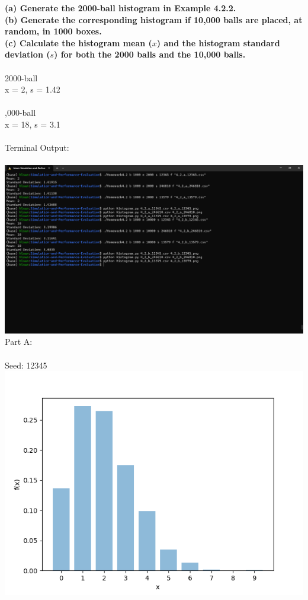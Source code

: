 \textbf{(a) Generate the 2000-ball histogram in Example 4.2.2.\\
(b) Generate the corresponding histogram if 10,000 balls are placed, at random, in 1000 boxes.\\
(c) Calculate the histogram mean ($x$) and the histogram standard deviation ($s$) for both the 2000 balls and the 10,000 balls.\\\\}
2000-ball\\
x = 2, s = 1.42\\\\
,000-ball\\
x = 18, s = 3.1\\\\
\noindent Terminal Output:\\\\
\includegraphics[scale=0.45]{Sections/Q2/4_2_terminal.png}\\
\newpage
\noindent Part A:\\\\
Seed: 12345\\
\includegraphics[scale=1]{Sections/Q2/4_2_a_12345.png}\\
